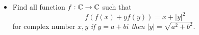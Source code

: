 \documentclass[11pt]{scrartcl}
\begin{document}
\begin{itemize}[label=,itemsep=0.4em,leftmargin=0em]
\begin{comment}
Claim 2: $f$ is injective on $\mathbb{R^+}$
Proof.
Suppose $f(a)=f(b)$ and $a > b$. Let $d = a - b, q = \frac{b}{a}, r= \frac{d}{a}$, we have $d,q,r > 0$ and $q < 1$.
Substituting $P(a,x), P(b,x) \ra a - af(a + x) = b - bf(b + x)$.

As $x \to x -b$ and let $\delta = 4b$ be sufficiently large, we get
\[
        f(x + d) = qf(x) + r, \forall x > \delta \tag{$\clubsuit$ }
    \]
We state and prove the following lemma:
Lemma. Consider the function $f: \mathbb{R^+} \to \mathbb{R^+}$ satisfying
\[
            f(x + d) = qf(x) + r, \forall x > M
        \]with $M$ being sufficiently large positive real number with $q < 1$ and $d, r > 0$. Then $\displaystyle \blim_{x \to +\infty} f(x) = \frac{r}{1 - q}$.
Proof. Substituting $x \to x + d$, we get\[f(x + 2d) = qf(x + d) + r = q(qf(x) + r) + r = q^2f(x) + qr + r, \forall x > \delta\]By induction it's easy to prove that\[f(x + nd) = q^nf(x) + r\sum_{i = 0}^n q^i, \forall x > \delta \tag{3}\]From $(3)$ we rewrite
\[
        f(x + nd) = q^nf(x) + r.\frac{1 - q^{n}}{1 - q}, \forall x > \delta \tag{4}
    \]From $(4)$, as $n \to +\infty$ with $q < 1$, we have
\[
        \blim_{x \to +\infty} f(x) = \displaystyle \blim f(x + nd) = \frac{r}{1 - q}
    \]This completes the proof.
Applying the above lemma to $(\clubsuit)$, we get $\displaystyle \blim_{x \to +\infty} f(x) = \frac{r}{1 - q}$.
But according to Claim 2, $f$ is not bounded above and $\displaystyle \blim_{x \to +\infty} f(x) = +\infty$, contradiction.
Therefore $q = 1$ or $d = 0 \ra a = b$. Hence $f$ is injective on $\mathbb{R^+}$.
Setting $P(1,1)$ we get $f(2) = f(1 + \frac{1}{f(1)})$. Since $f$ is injective, $f(1) = 1$.
Give $P(1,x)$ the we get the satisfied function is $\boxed{f(x) = \frac{1}{x}, \forall x > 0}$. 
       \end{comment}
       \item \begin{btvn}
        Find all function $f: \mathbb{C} \to \mathbb{C}$ such that 
        \[f(f(x)+yf(y))=x+|y|^2\]
            for complex number $x,y$
         \textit{if $y = a + bi$ then $|y| = \sqrt{a^2 + b^2}$}.
    \end{btvn}
    \begin{comment}
        Let $P(x,y)$ be the assertion $f(f(x)+yf(y))=x+|y|^2$.
        $P(x,0) \implies f(f(x))=x$. With this $P(x,f(y)) \implies |y| = |f(y)|$ for all $y\in \mathbb{C}$ which leads us to $f(0)=0$.


\end{comment}
\end{itemize}
\end{document}
